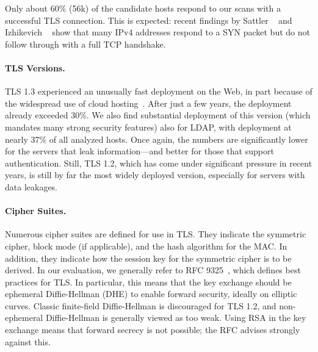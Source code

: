 Only about 60\% (56k) of the candidate hosts respond to our scans with a successful \acrshort{TLS} connection. This is expected: recent findings by Sattler \etal~\cite{Sattler2023} and Izhikevich \etal~\cite{Izhikevich2022} show that many IPv4 addresses respond to a SYN packet but do not follow through with a full TCP handshake.

\paragraph{TLS Versions.} \acrshort{TLS} 1.3 experienced an unusually fast deployment on the Web, in part because of the widespread use of cloud hosting~\cite{Holz2020}. After just a few years, the deployment already exceeded 30\%. We also find substantial deployment of this version (which mandates many strong security features) also for \acrshort{LDAP}, with deployment at nearly 37\% of all analyzed hosts. Once again, the numbers are significantly lower for the servers that leak information---and better for those that support authentication. Still, TLS 1.2, which has come under significant pressure in recent years, is still by far the most widely deployed version, especially for servers with data leakages.


\paragraph{Cipher Suites.} Numerous cipher suites are defined for use in \acrshort{TLS}. They indicate the symmetric cipher, block mode (if applicable), and the hash algorithm for the \gls{MAC}. In addition, they indicate how the session key for the symmetric cipher is to be derived. In our evaluation, we generally refer to RFC 9325~\cite{rfc9325}, which defines best practices for \acrshort{TLS}. In particular, this means that the key exchange should be ephemeral Diffie-Hellman (DHE) to enable forward security, ideally on elliptic curves. Classic finite-field Diffie-Hellman is discouraged for \acrshort{TLS} 1.2, and non-ephemeral Diffie-Hellman is generally viewed as too weak. Using RSA in the key exchange means that forward secrecy is not possible; the RFC advises strongly against this.

